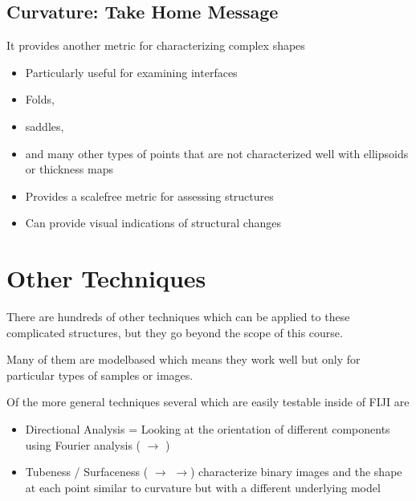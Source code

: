 \documentclass[letterpaper,10pt,english]{sphinxmanual}
\begin{document}
\section{Curvature: Take Home Message}
\label{\detokenize{06-AdvancedShapeAndTexture:curvature-take-home-message}}
\sphinxAtStartPar
It provides another metric for characterizing complex shapes
\begin{itemize}
\item {} 
\sphinxAtStartPar
Particularly useful for examining interfaces

\item {} 
\sphinxAtStartPar
Folds,

\item {} 
\sphinxAtStartPar
saddles,

\item {} 
\sphinxAtStartPar
and many other types of points that are not characterized well with ellipsoids or thickness maps

\item {} 
\sphinxAtStartPar
Provides a scale\sphinxhyphen{}free metric for assessing structures

\item {} 
\sphinxAtStartPar
Can provide visual indications of structural changes

\end{itemize}


\chapter{Other Techniques}
\label{\detokenize{06-AdvancedShapeAndTexture:other-techniques}}
\sphinxAtStartPar
There are hundreds of other techniques which can be applied to these complicated structures, but they go beyond the scope of this course.

\sphinxAtStartPar
Many of them are model\sphinxhyphen{}based which means they work well but only for particular types of samples or images.

\sphinxAtStartPar
Of the more general techniques several which are easily testable inside of FIJI are
\begin{itemize}
\item {} 
\sphinxAtStartPar
Directional Analysis = Looking at the orientation of different components using Fourier analysis ( \(\rightarrow\) )

\item {} 
\sphinxAtStartPar
Tubeness / Surfaceness ( \(\rightarrow\)  \(\rightarrow\)) characterize binary images and the shape at each point similar to curvature but with a different underlying model

\end{itemize}
\end{document}
